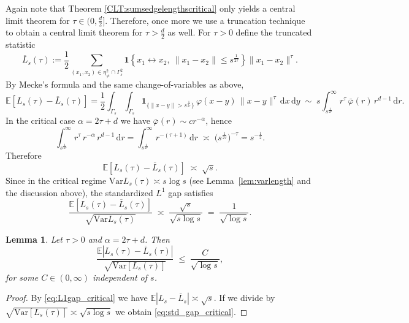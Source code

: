 \documentclass{article}
\newtheorem{lemma}[theorem]{Lemma}
\theoremstyle{definition}
\numberwithin{equation}{section}
\theoremstyle{remark}
\newcommand{\E}{\mathbb{E}}
\newcommand{\Var}{\mathrm{Var}}
\begin{document}
Again note that Theorem \ref{CLT:sumsedgelengthscritical} only yields a central limit theorem for $\tau\in (0, \frac{d}{2}]$. Therefore, once more we use a truncation technique to obtain a central limit theorem for $\tau > \frac{d}{2}$ as well. For $\tau>0$ define the truncated statistic
\[
\overline{L}_s(\tau)
:= \frac{1}{2}\sum_{(x_1,x_2)\in \eta^2_{\neq}\cap \Gamma_s^2}
\mathbf{1}\!\left\{x_1\leftrightarrow x_2,\ \|x_1-x_2\|\le s^{\frac{1}{2\tau}}\right\}
\|x_1-x_2\|^{\tau}.
\]
By Mecke’s formula and the same change-of-variables as above,
\[
\mathbb{E}\!\left[L_s(\tau)-\overline{L}_s(\tau)\right]
= \frac{1}{2}\int_{\Gamma_s}\!\!\int_{\Gamma_s}
\mathbf{1}_{\{\|x-y\|>s^{\frac{1}{2\tau}}\}}\,
\varphi(x-y)\,\|x-y\|^{\tau}\,\mathrm{d}x\,\mathrm{d}y
\;\sim\;
s\!\int_{s^{\frac{1}{2\tau}}}^{\infty}\! r^{\tau}\,\bar{\varphi}(r)\,r^{d-1}\,\mathrm{d}r.
\]
In the critical case $\alpha=2\tau+d$ we have $\bar{\varphi}(r)\sim cr^{-\alpha}$, hence
\[
\int_{s^{\frac{1}{2\tau}}}^{\infty} r^{\tau}\,r^{-\alpha}\,r^{d-1}\,\mathrm{d}r
=\int_{s^{\frac{1}{2\tau}}}^{\infty} r^{-(\tau+1)}\,\mathrm{d}r
\;\asymp\; \big(s^{\frac{1}{2\tau}}\big)^{-\tau}
= s^{-\frac{1}{2}}.
\]
Therefore
\begin{equation}\label{eq:L1gap_critical}
\mathbb{E}\!\left[L_s(\tau)-\overline{L}_s(\tau)\right]
\;\asymp\; \sqrt{s}.
\end{equation}
Since in the critical regime $\Var L_s(\tau)\asymp s\log s$ (see Lemma~\ref{lem:varlength} and the discussion above),
the standardized $L^1$ gap satisfies
\begin{equation}\label{eq:std_gap_critical}
\frac{\mathbb{E}\!\left[L_s(\tau)-\overline{L}_s(\tau)\right]}
{\sqrt{\Var L_s(\tau)}}
\;\asymp\; \frac{\sqrt{s}}{\sqrt{s\log s}}
\;=\; \frac{1}{\sqrt{\log s}}.
\end{equation}

\begin{lemma}\label{lem:critical_truncation_gap}
Let $\tau>0$ and $\alpha=2\tau+d$. Then
\[
\frac{\mathbb{E}\!\left|L_s(\tau)-\overline{L}_s(\tau)\right|}
{\sqrt{\Var[L_s(\tau)]}}
\;\le\; \frac{C}{\sqrt{\log s}},
\]
for some $C\in(0,\infty)$ independent of $s$.
\end{lemma}

\begin{proof}
By \eqref{eq:L1gap_critical} we have $\E|L_s-\overline{L}_s|\asymp\sqrt{s}$.
If we divide by $\sqrt{\Var[L_s(\tau)]}\asymp \sqrt{s\log s}$ we obtain \eqref{eq:std_gap_critical}.
\end{proof}
\end{document}
